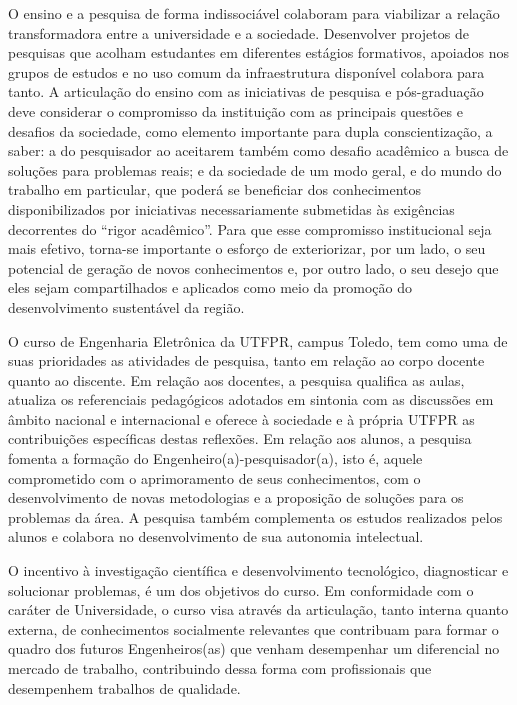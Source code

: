 O ensino e a pesquisa de forma indissociável colaboram para viabilizar a relação transformadora entre a universidade e a sociedade. Desenvolver projetos de pesquisas que acolham estudantes em diferentes estágios formativos, apoiados nos grupos de estudos e no uso comum da infraestrutura disponível colabora para tanto. A articulação do ensino com as iniciativas de pesquisa e pós-graduação deve considerar o compromisso da instituição com as principais questões e desafios da sociedade, como elemento importante para dupla conscientização, a saber: a do pesquisador ao aceitarem também como desafio acadêmico a busca de soluções para problemas reais; e da sociedade de um modo geral, e do mundo do trabalho em particular, que poderá se beneficiar dos conhecimentos disponibilizados por iniciativas necessariamente submetidas às exigências decorrentes do ``rigor acadêmico''. Para que esse compromisso institucional seja mais efetivo, torna-se importante o esforço de exteriorizar, por um lado, o seu potencial de geração de novos conhecimentos e, por outro lado, o seu desejo que eles sejam compartilhados e aplicados como meio da promoção do desenvolvimento sustentável da região.

O curso de Engenharia Eletrônica da UTFPR, campus Toledo, tem como uma de suas prioridades as atividades de pesquisa, tanto em relação ao corpo docente quanto ao discente. Em relação aos docentes, a pesquisa qualifica as aulas, atualiza os referenciais pedagógicos adotados em sintonia com as discussões em âmbito nacional e internacional e oferece à sociedade e à própria UTFPR as contribuições específicas destas reflexões. Em relação aos alunos, a pesquisa fomenta a formação do Engenheiro(a)-pesquisador(a), isto é, aquele comprometido com o aprimoramento de seus conhecimentos, com o desenvolvimento de novas metodologias e a proposição de soluções para os problemas da área. A pesquisa também complementa os estudos realizados pelos alunos e colabora no desenvolvimento de sua autonomia intelectual.

O incentivo à investigação científica e desenvolvimento tecnológico, diagnosticar e solucionar problemas, é um dos objetivos do curso. Em conformidade com o caráter de Universidade, o curso visa através da articulação, tanto interna quanto externa, de conhecimentos socialmente relevantes que contribuam para formar o quadro dos futuros Engenheiros(as) que venham desempenhar um diferencial no mercado de trabalho, contribuindo dessa forma com profissionais que desempenhem trabalhos de qualidade.

